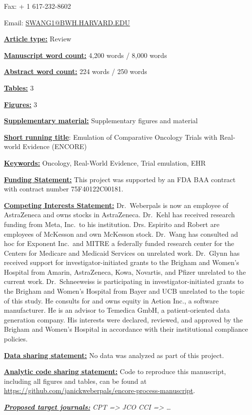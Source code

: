 \documentclass[
  letterpaper,
  DIV=11,
  numbers=noendperiod]{scrartcl}
\begin{document}
Fax: + 1 617-232-8602

Email: \url{SWANG1@BWH.HARVARD.EDU}

\ul{\textbf{Article type:}} Review

\ul{\textbf{Manuscript word count:}} 4,200 words / 8,000 words

\ul{\textbf{Abstract word count:}} 224 words / 250 words

\ul{\textbf{Tables:}} 3

\ul{\textbf{Figures:}} 3

\ul{\textbf{Supplementary material:}} Supplementary figures and material

\ul{\textbf{Short running title}}: Emulation of Comparative Oncology
Trials with Real-world Evidence (ENCORE)

\ul{\textbf{Keywords:}} Oncology, Real-World Evidence, Trial emulation,
EHR

\ul{\textbf{Funding Statement:}} This project was supported by an FDA
BAA contract with contract number 75F40122C00181.

\ul{\textbf{Competing Interests Statement:}} Dr.~Weberpals is now an
employee of AstraZeneca and owns stocks in AstraZeneca. Dr.~Kehl has
received research funding from Meta, Inc.~to his institution. Drs.
Espirito and Robert are employees of McKesson and own McKesson stock.
Dr.~Wang has consulted ad hoc for Exponent Inc.~and MITRE a federally
funded research center for the Centers for Medicare and Medicaid
Services on unrelated work. Dr.~Glynn has received support for
investigator-initiated grants to the Brigham and Women's Hospital from
Amarin, AstraZeneca, Kowa, Novartis, and Pfizer unrelated to the current
work. Dr.~Schneeweiss is participating in investigator-initiated grants
to the Brigham and Women's Hospital from Bayer and UCB unrelated to the
topic of this study. He consults for and owns equity in Aetion Inc., a
software manufacturer. He is an advisor to Temedica GmbH, a
patient-oriented data generation company. His interests were declared,
reviewed, and approved by the Brigham and Women's Hospital in accordance
with their institutional compliance policies.

\ul{\textbf{Data sharing statement:}} No data was analyzed as part of
this project.

\ul{\textbf{Analytic code sharing statement:}} Code to reproduce this
manuscript, including all figures and tables, can be found at
\url{https://github.com/janickweberpals/encore-process-manuscript}.

\ul{\textbf{\emph{Proposed target journals:}}} \emph{CPT =\textgreater{}
JCO CCI =\textgreater{} \ldots{}}
\end{document}
